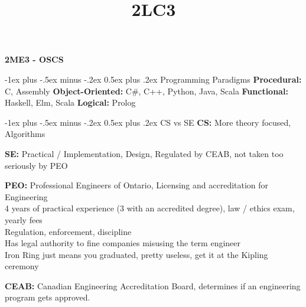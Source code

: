 \documentclass[letterpaper, 8pt]{extarticle}
\title{2LC3}
\makeatletter
\renewcommand{\section}{\@startsection{section}{1}{0mm}%
                                {-1ex plus -.5ex minus -.2ex}%
                                {0.5ex plus .2ex}%
                                {\normalfont\normalsize\bfseries}}
\makeatother
\begin{document}
\raggedright
\tiny

\begin{center}
  {\textbf{2ME3 - OSCS}} \\
\end{center}
\begin{multicols*}{6}
  \setlength{\premulticols}{1pt}
  \setlength{\postmulticols}{1pt}
  \setlength{\multicolsep}{1pt}
  \setlength{\columnsep}{2pt}

  \section{Programming Paradigms}
  \textbf{Procedural:} C, Assembly
  \textbf{Object-Oriented:} C\#, C++, Python, Java, Scala
  \textbf{Functional:} Haskell, Elm, Scala
  \textbf{Logical:} Prolog

  \section{CS vs SE}
  \textbf{CS:} More theory focused, Algorithms

  \textbf{SE:} Practical / Implementation, Design,
  Regulated by CEAB, not taken too seriously by PEO

  \textbf{PEO:} Professional Engineers of Ontario, Licensing and accreditation for Engineering \\
  4 years of practical experience (3 with an accredited degree), law / ethics exam, yearly fees \\
  Regulation, enforcement, discipline \\
  Has legal authority to fine companies misusing the term engineer \\
  Iron Ring just means you graduated, pretty useless, get it at the Kipling ceremony

  \textbf{CEAB:} Canadian Engineering Accreditation Board,
  determines if an engineering program gets approved.


\end{multicols*}
\end{document}
